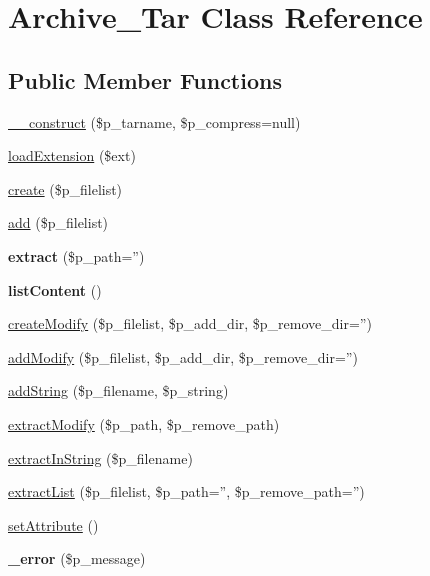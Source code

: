 \hypertarget{classArchive__Tar}{
\section{Archive\_\-Tar Class Reference}
\label{classArchive__Tar}
}
\subsection*{Public Member Functions}
\begin{DoxyCompactItemize}
\item 
\hyperlink{classArchive__Tar_abf30f117a6be31f3abb8ce032f263756}{\_\-\_\-construct} (\$p\_\-tarname, \$p\_\-compress=null)
\item 
\hyperlink{classArchive__Tar_a167fc59d011b7581e74a75c9fe899256}{loadExtension} (\$ext)
\item 
\hyperlink{classArchive__Tar_ad96d5e37735b750dffc2bd6a6eb0ec9a}{create} (\$p\_\-filelist)
\item 
\hyperlink{classArchive__Tar_a507e2889d298e62403d0aac1e149c7a4}{add} (\$p\_\-filelist)
\item 
\hypertarget{classArchive__Tar_a4927c2df3eb114962d0bb70cb05a54f0}{
{\bfseries extract} (\$p\_\-path='')}
\label{classArchive__Tar_a4927c2df3eb114962d0bb70cb05a54f0}

\item 
\hypertarget{classArchive__Tar_a3604517c3283a60a85beb8c4ef456510}{
{\bfseries listContent} ()}
\label{classArchive__Tar_a3604517c3283a60a85beb8c4ef456510}

\item 
\hyperlink{classArchive__Tar_accecf70468a22e87d19a927f6802b8f2}{createModify} (\$p\_\-filelist, \$p\_\-add\_\-dir, \$p\_\-remove\_\-dir='')
\item 
\hyperlink{classArchive__Tar_a87c8ae9ed359f1caf7d346649d9155a4}{addModify} (\$p\_\-filelist, \$p\_\-add\_\-dir, \$p\_\-remove\_\-dir='')
\item 
\hyperlink{classArchive__Tar_a245e7d8942e653113c37ff4324757ecf}{addString} (\$p\_\-filename, \$p\_\-string)
\item 
\hyperlink{classArchive__Tar_ad15a78b140633ef64481df2d0d9e499b}{extractModify} (\$p\_\-path, \$p\_\-remove\_\-path)
\item 
\hyperlink{classArchive__Tar_a6271191374127bc47db5a36fb4776a9f}{extractInString} (\$p\_\-filename)
\item 
\hyperlink{classArchive__Tar_af670430ca3efa3f4850a2cd1347c7d59}{extractList} (\$p\_\-filelist, \$p\_\-path='', \$p\_\-remove\_\-path='')
\item 
\hyperlink{classArchive__Tar_a23243800cb7b3a4ae6640c2f48f076bd}{setAttribute} ()
\item 
\hypertarget{classArchive__Tar_ab3caf377b4468022d558e9d3c9440bcc}{
{\bfseries \_\-error} (\$p\_\-message)}
\label{classArchive__Tar_ab3caf377b4468022d558e9d3c9440bcc}


\end{DoxyCompactItemize}
